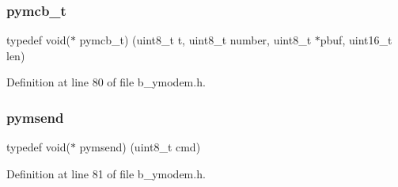 \subsubsection{\texorpdfstring{pymcb\+\_\+t}{pymcb\_t}}
{\footnotesize\ttfamily typedef void($\ast$ pymcb\+\_\+t) (uint8\+\_\+t t, uint8\+\_\+t number, uint8\+\_\+t $\ast$pbuf, uint16\+\_\+t len)}



Definition at line 80 of file b\+\_\+ymodem.\+h.

\mbox{\label{group___y_m_o_d_e_m___exported___types_definitions_ga2429c212fbcca5113135547532d6181b}} 
\subsubsection{\texorpdfstring{pymsend}{pymsend}}
{\footnotesize\ttfamily typedef void($\ast$ pymsend) (uint8\+\_\+t cmd)}



Definition at line 81 of file b\+\_\+ymodem.\+h.

